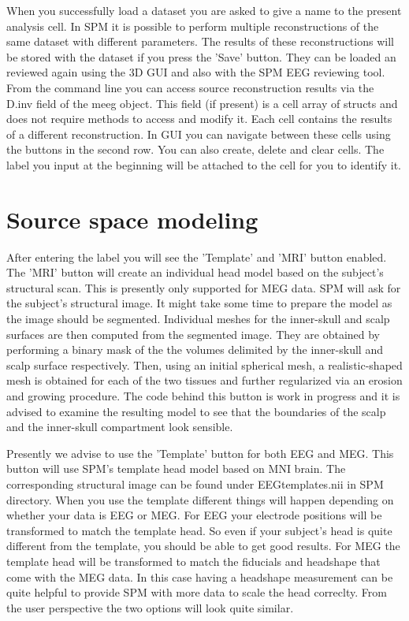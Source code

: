 When you successfully load a dataset you are asked to give a name to the present analysis cell. In SPM it is possible to
perform multiple reconstructions of the same dataset with different parameters. The results of these reconstructions
will be stored with the dataset if you press the 'Save' button. They can be loaded an reviewed again using
the 3D GUI and also with the SPM EEG reviewing tool. From the command line you can access source reconstruction
results via the D.inv field of the meeg object. This field (if present) is a cell array of structs and does not require
methods to access and modify it. Each cell contains the results of a different reconstruction. In GUI you
can navigate between these cells using the buttons in the second row. You can also create, delete and clear cells.
The label you input at the beginning will be attached to the cell for you to identify it.


\section{Source space modeling}

After entering the label you will see the 'Template' and 'MRI' button enabled. The 'MRI' button will 
create an individual head model based on the subject's structural scan. This is presently only supported for MEG
data. SPM will ask for the subject's structural image. It might take some time to prepare the model as the image
should be segmented. Individual meshes for the inner-skull and scalp surfaces are then computed from the
segmented image. They are obtained by performing a binary mask of the the volumes 
delimited by the inner-skull and scalp surface respectively. Then, using an initial 
spherical mesh, a realistic-shaped mesh is obtained for each of the two tissues 
and further regularized via an erosion and growing procedure. The code behind this button is work 
in progress and it is advised to examine the resulting
model to see that the boundaries of the scalp and the inner-skull compartment look sensible. 

Presently we advise to use the 'Template' button for both EEG and MEG. This button will use SPM's template head
model based on MNI brain. The corresponding structural image can be found under EEGtemplates\smri.nii in SPM
directory. When you use the template different things will happen depending on whether your data is EEG or MEG.
For EEG your electrode positions will be transformed to match the template head. So even if your subject's head
is quite different from the template, you should be able to get good results. For MEG the template head will
be transformed to match the fiducials and headshape that come with the MEG data. In this case having a headshape
measurement can be quite helpful to provide SPM with more data to scale the head correclty. From the user
perspective the two options will look quite similar.

